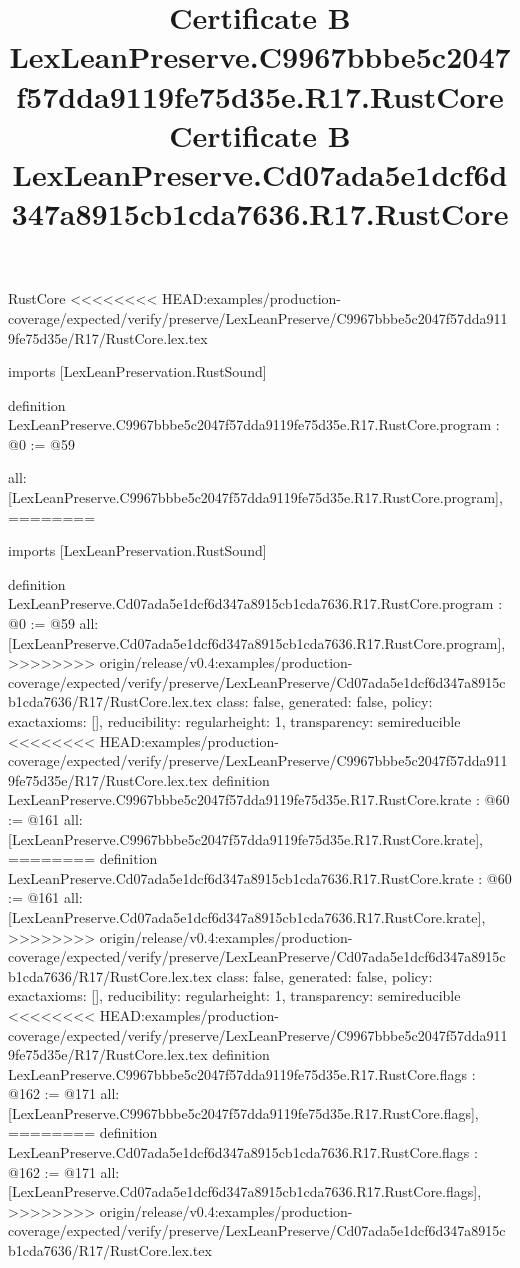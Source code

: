 \begin{lexlean}{RustCore}
<<<<<<<< HEAD:examples/production-coverage/expected/verify/preserve/LexLeanPreserve/C9967bbbe5c2047f57dda9119fe75d35e/R17/RustCore.lex.tex
\title{Certificate B LexLeanPreserve.C9967bbbe5c2047f57dda9119fe75d35e.R17.RustCore}
\begin{coremodule}
imports [LexLeanPreservation.RustSound]

definition LexLeanPreserve.C9967bbbe5c2047f57dda9119fe75d35e.R17.RustCore.program : @0 := @59 {
  all: [LexLeanPreserve.C9967bbbe5c2047f57dda9119fe75d35e.R17.RustCore.program],
========
\title{Certificate B LexLeanPreserve.Cd07ada5e1dcf6d347a8915cb1cda7636.R17.RustCore}
\begin{coremodule}
imports [LexLeanPreservation.RustSound]

definition LexLeanPreserve.Cd07ada5e1dcf6d347a8915cb1cda7636.R17.RustCore.program : @0 := @59 {
  all: [LexLeanPreserve.Cd07ada5e1dcf6d347a8915cb1cda7636.R17.RustCore.program],
>>>>>>>> origin/release/v0.4:examples/production-coverage/expected/verify/preserve/LexLeanPreserve/Cd07ada5e1dcf6d347a8915cb1cda7636/R17/RustCore.lex.tex
  class: false,
  generated: false,
  policy: exact{axioms: []},
  reducibility: regular{height: 1},
  transparency: semireducible
}
<<<<<<<< HEAD:examples/production-coverage/expected/verify/preserve/LexLeanPreserve/C9967bbbe5c2047f57dda9119fe75d35e/R17/RustCore.lex.tex
definition LexLeanPreserve.C9967bbbe5c2047f57dda9119fe75d35e.R17.RustCore.krate : @60 := @161 {
  all: [LexLeanPreserve.C9967bbbe5c2047f57dda9119fe75d35e.R17.RustCore.krate],
========
definition LexLeanPreserve.Cd07ada5e1dcf6d347a8915cb1cda7636.R17.RustCore.krate : @60 := @161 {
  all: [LexLeanPreserve.Cd07ada5e1dcf6d347a8915cb1cda7636.R17.RustCore.krate],
>>>>>>>> origin/release/v0.4:examples/production-coverage/expected/verify/preserve/LexLeanPreserve/Cd07ada5e1dcf6d347a8915cb1cda7636/R17/RustCore.lex.tex
  class: false,
  generated: false,
  policy: exact{axioms: []},
  reducibility: regular{height: 1},
  transparency: semireducible
}
<<<<<<<< HEAD:examples/production-coverage/expected/verify/preserve/LexLeanPreserve/C9967bbbe5c2047f57dda9119fe75d35e/R17/RustCore.lex.tex
definition LexLeanPreserve.C9967bbbe5c2047f57dda9119fe75d35e.R17.RustCore.flags : @162 := @171 {
  all: [LexLeanPreserve.C9967bbbe5c2047f57dda9119fe75d35e.R17.RustCore.flags],
========
definition LexLeanPreserve.Cd07ada5e1dcf6d347a8915cb1cda7636.R17.RustCore.flags : @162 := @171 {
  all: [LexLeanPreserve.Cd07ada5e1dcf6d347a8915cb1cda7636.R17.RustCore.flags],
>>>>>>>> origin/release/v0.4:examples/production-coverage/expected/verify/preserve/LexLeanPreserve/Cd07ada5e1dcf6d347a8915cb1cda7636/R17/RustCore.lex.tex
}}}
\end{coremodule}}
\end{coremodule}
\end{lexlean}
